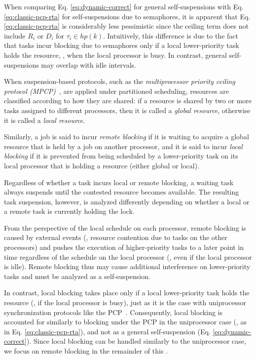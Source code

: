 When comparing Eq. \eqref{eq:dynamic-correct}  for general self-suspensions  with Eq.  \eqref{eq:classic-pcp-rta} for self-suspensions due to semaphores, it is apparent that Eq. \eqref{eq:classic-pcp-rta} is considerably less pessimistic since the ceiling term does not include $R_i$ or $D_i$ for $\tau_i \in hp(k)$. Intuitively, this difference is due to the fact that tasks incur blocking due to semaphores only if a local lower-priority task holds the resource, \ie, when the local processor is busy. In contrast, general self-suspensions may overlap with idle intervals.


\label{sec:sem-multi}

When suspension-based protocols, such as the \emph{multiprocessor priority ceiling protocol (MPCP)}~\cite{rajkumar-1990}, are applied under partitioned scheduling, resources are classified according to how they are shared: if a resource is shared by two or more tasks assigned to different processors, then it is called a \emph{global resource}, otherwise it is called a \emph{local resource}.

Similarly, a job is said to incur \emph{remote blocking} if it is waiting to acquire a global resource that is held by a job on another processor, and it is said to incur \emph{local blocking} if it is prevented from being scheduled by a lower-priority task on its local processor that is holding a resource (either global or local).

Regardless of whether a task incurs local or remote blocking, a waiting task always suspends until the contested resource becomes available. The resulting task suspension, however, is analyzed differently depending on whether a local or a remote task is currently holding the lock.

From the perspective of the local schedule on each processor, remote blocking is caused by external events (\ie, resource contention due to tasks on the other processors) and pushes the execution of higher-priority tasks to a later point in time  regardless of the schedule on the local processor (\ie, even if the local processor is idle). Remote blocking thus may cause additional interference on lower-priority tasks and must be analyzed as a self-suspension.

In contrast, local blocking takes place only if a local lower-priority task holds the resource (\ie, if the local processor is busy), just as it is the case with uniprocessor synchronization protocols like the PCP~\cite{SRL:90}. Consequently, local blocking is accounted for similarly to blocking under the PCP in the uniprocessor case (\ie, as in Eq. \eqref{eq:classic-pcp-rta}), and not as a general self-suspension (Eq. \eqref{eq:dynamic-correct}). Since local blocking can be handled similarly to the uniprocessor case, we focus on remote blocking in the remainder of this \mysectionrefnormal{}.


